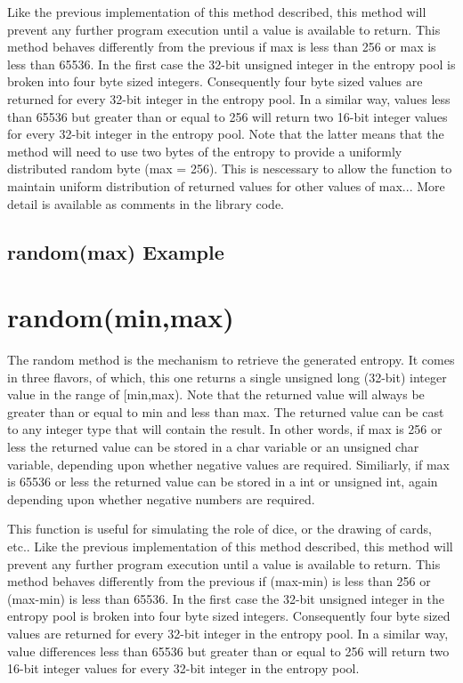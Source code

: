 \documentclass[10pt]{report}
\newcommand{\code}[2]{
 \hrulefill
 \subsection*{#1}
 
 \vspace{2em}
}
\begin{document}
Like the previous implementation of this method described, this method will prevent any further program execution until a value is available to return.  This method behaves differently
from the previous if max is less than 256 or max is less than 65536.  In the first case the 32-bit unsigned integer in the entropy pool is broken into four byte sized integers. 
Consequently four byte sized values are returned for every 32-bit integer in the entropy pool.  In a similar way, values less than 65536 but greater than or equal to 256 will return 
two 16-bit integer values for every 32-bit integer in the entropy pool.  Note that the latter means that the method will need to use two bytes of the entropy to provide a uniformly
distributed random byte (max = 256).  This is nescessary to allow the function to maintain uniform distribution of returned values for other values of max...  More detail is available 
as comments in the library code.

\code{random(max) Example}{random_max_example.ino}

\section{random(min,max)}

The random method is the mechanism to retrieve the generated entropy.  It comes in three flavors, of which, this one returns a single unsigned long (32-bit) integer value in the range
of [min,max).  Note that the returned value will always be greater than or equal to min and less than max.  The returned value can be cast to any integer type that will contain the 
result.  In other words, if max is 256 or less the returned value can be stored in a char variable or an unsigned char variable, depending upon whether negative values are required. 
Similiarly, if max is 65536 or less the returned value can be stored in a int or unsigned int, again depending upon whether negative numbers are required.  

This function is useful for simulating the role of dice, or the drawing of cards, etc..  Like the previous implementation of this method described, this method will prevent any further 
program execution until a value is available to return.  This method behaves differently from the previous if (max-min) is less than 256 or (max-min) is less than 65536.  In the first case the 
32-bit unsigned integer in the entropy pool is broken into four byte sized integers. Consequently four byte sized values are returned for every 32-bit integer in the entropy pool.  In
a similar way, value differences less than 65536 but greater than or equal to 256 will return two 16-bit integer values for every 32-bit integer in the entropy pool. 
\end{document}

